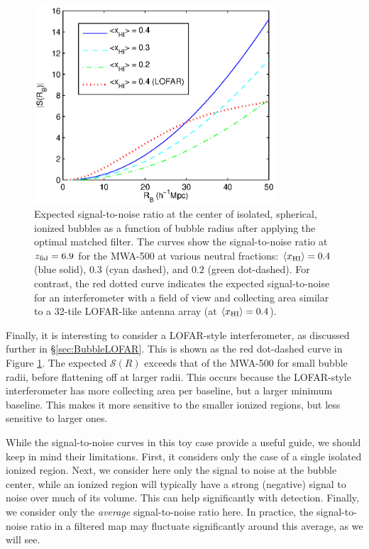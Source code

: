 \begin{figure}[h]
  \centering
  \includegraphics[width=9cm]{f4.eps}
  \caption{Expected signal-to-noise ratio at the center of
            isolated, spherical, ionized bubbles as a function of bubble
            radius after applying the optimal matched filter. The
curves show the signal-to-noise ratio at $z_{\rm fid} = 6.9$ for the
MWA-500 at various neutral fractions: $\langle x_{\text{HI}}\rangle = 0.4$ (blue solid), $0.3$
            (cyan dashed), and $0.2$ (green dot-dashed). For contrast, the red dotted curve indicates the
            expected signal-to-noise for an interferometer 
with a field of view and collecting area
            similar to a 32-tile LOFAR-like antenna array (at $\langle x_{\text{HI}}\rangle = 0.4$).}
  \label{fig:ToySNR}
\end{figure}


Finally, it is interesting to consider a LOFAR-style interferometer, as 
discussed further
in \S\ref{sec:BubbleLOFAR}. This is shown as the red dot-dashed curve in Figure \ref{fig:ToySNR}.
The expected $\mathcal{S}(R)$ exceeds that of the MWA-500 for small bubble radii, before
flattening off at larger radii. This occurs because the LOFAR-style interferometer
has more collecting area per baseline, but a larger minimum baseline. This makes it
more sensitive to the smaller ionized regions, but less sensitive to larger ones.

While the signal-to-noise curves in this toy case provide a useful guide, we should keep in mind their limitations. 
First, it considers only the case of a single isolated ionized region. Next, we consider here only
the signal to noise at the bubble center, while an ionized region will typically have
a strong (negative) signal to noise over much of its volume. This can help significantly with
detection. Finally, we consider only the {\em average} signal-to-noise ratio here. In
practice, the signal-to-noise ratio in a filtered map may fluctuate significantly around
this average, as we will see.

